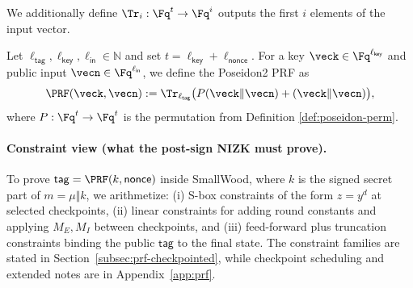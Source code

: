 We additionally define
$\Tr_i:\Fq^t\to \Fq^{i}$ outputs the first $i$ elements of the input vector.

\begin{definition}\label{def:poseidon-prf}
Let $\ell_{\mathsf{tag}},\ell_{\mathsf{key}},\ell_{\mathsf{in}}\in \mathbb{N}$ and set $t=\ell_{\mathsf{key}}+\ell_{\mathsf{nonce}}$. For a key 
 $\veck\in\Fq^{\ell_{\mathsf{key}}}$  and public input 
$\vecn \in\Fq^{\ell_{\mathsf{in}}}$, we define the Poseidon2 PRF as 
\[
  \PRF(\veck,\vecn) := \Tr_{\ell_{\mathsf{tag}}}\big(P(\veck\Vert \vecn) + (\veck\Vert \vecn)\big),
\]
where $P:\Fq^t\to \Fq^t$ is the permutation from Definition \ref{def:poseidon-perm}.
\end{definition}



\paragraph{Constraint view (what the post-sign NIZK must prove).}
To prove $\mathsf{tag}=\PRF(k,\mathsf{nonce})$ inside SmallWood, where \(k\) is the signed secret part of
\(m=\mu\Vert k\), we arithmetize:
(i) S-box constraints of the form $z = y^d$ at selected checkpoints,
(ii) linear constraints for adding round constants and applying $M_E,M_I$ between checkpoints,
and (iii) feed-forward plus truncation constraints binding the public $\mathsf{tag}$ to the final state.
The constraint families are stated in Section~\ref{subsec:prf-checkpointed}, while checkpoint scheduling and extended
notes are in Appendix~\ref{app:prf}.
